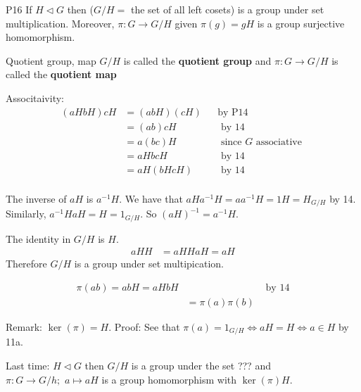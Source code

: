 \documentclass{article}
\begin{document}
\begin{cprop}{P16}{}
    If $H \triangleleft G$ then ($G/H = $ the set of all left cosets) is a group under set multiplication. Moreover, $\pi : G \to G/H$ given $\pi(g) = gH$ is a group surjective homomorphism. 
    \begin{cdef}{Quotient group, map}{}
        $G/H$ is called the \textbf{quotient group} and $\pi : G \to G/H$ is called the \textbf{quotient map}
    \end{cdef}

    \begin{cpf}
        Associtaivity: 
        \begin{align*}
            (aHbH)cH & = (abH)(cH) && \text{by P14}\\
            & = (ab)cH && \text{ by 14 }\\
            & = a(bc)H && \text{ since $G$ associative }\\
            & = aHbcH &&\text{ by 14}\\
            & = aH(bHcH) &&\text{ by 14}\\
        \end{align*}

        The inverse of $aH$ is $a^{-1}H$. We have that $aHa^{-1}H = aa^{-1}H = 1H = H_{G/H}$ by 14. Similarly, $a^{-1}H aH = H = 1_{G/H}$. So $\left( aH \right)^{-1} = a^{-1}H$. 

        The identity in $G/H$ is $H$. 
        \begin{align*}
            aHH & = aH
            HaH = aH
        \end{align*}
        Therefore $G/H$ is a group under set multipication. 

        \begin{align*}
            \pi(ab) = abH = aHbH &&\text{ by 14}\\
            & = \pi(a)\pi(b)
        \end{align*}
    \end{cpf}

\end{cprop}

Remark: $\ker(\pi) = H$. Proof: See that $\pi(a) = 1_{G/H} \iff aH = H \iff a \in H$ by 11a.



Last time: $H \triangleleft G$ then $G/H$ is a group under the set ??? and $\pi : G \to G/h; \, \, a \mapsto aH$ is a group homomorphism with $\ker(\pi) H$. 
\end{document}
